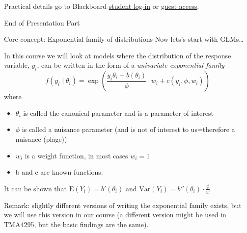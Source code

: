\documentclass[
  ignorenonframetext,
]{beamer}
\begin{document}
\begin{frame}{Practical details}
\protect\hypertarget{practical-details}{}
go to Blackboard \href{https://innsida.ntnu.no/bb-student}{student
log-in} or
\href{https://ntnu.blackboard.com/webapps/login?action=guest_login\&new_loc=/webapps/blackboard/execute/courseMain?course_id=_11002_1}{guest
access}.
\end{frame}

\begin{frame}{End of Presentation Part}
\protect\hypertarget{end-of-presentation-part}{}
\end{frame}

\begin{frame}{Core concept: Exponential family of distributions}
\protect\hypertarget{core-concept-exponential-family-of-distributions}{}
Now lets's start with GLMs\ldots{}
\end{frame}

\begin{frame}
In this course we will look at models where the distribution of the
response variable, \(y_i\), can be written in the form of a
\emph{univariate exponential family}
\[ f(y_i\mid \theta_i)=\exp \left( \frac{y_i \theta_i-b(\theta_i)}{\phi}\cdot w_i + c(y_i, \phi, w_i) \right) \]
where

\begin{itemize}
\item
  \(\theta_i\) is called the canonical parameter and is a parameter of
  interest
\item
  \(\phi\) is called a nuisance parameter (and is not of interest to
  us=therefore a nuisance (plage))
\item
  \(w_i\) is a weight function, in most cases \(w_i=1\)
\item
  b and c are known functions.
\end{itemize}

It can be shown that \(\text{E}(Y_i)=b'(\theta_i)\) and
\(\text{Var}(Y_i)=b''(\theta_i)\cdot \frac{\phi}{w}\).

Remark: slightly different versions of writing the exponential family
exists, but we will use this version in our course (a different version
might be used in TMA4295, but the basic findings are the same).
\end{frame}
\end{document}
